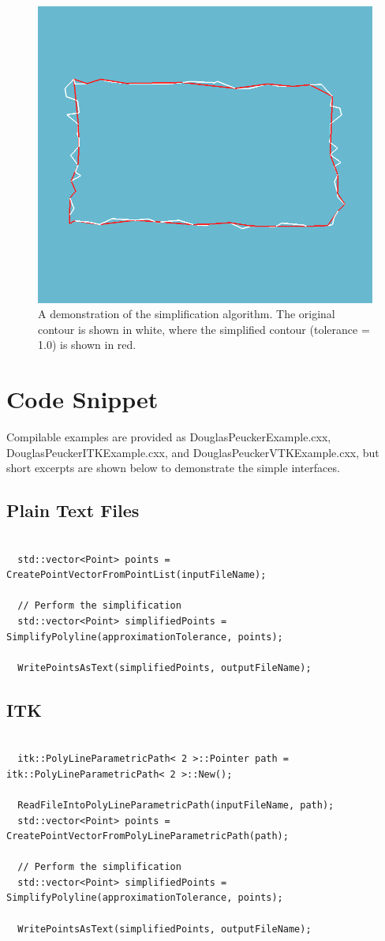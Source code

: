 \documentclass{InsightArticle}
\begin{document}
\begin{figure}[H]
  \centering
  \includegraphics[width=0.3\linewidth]{images/demo}
  \caption{A demonstration of the simplification algorithm. The original contour is shown in white, where the simplified contour (tolerance = 1.0) is shown in red.}
  \label{fig:Demo}
\end{figure}


\section{Code Snippet}

Compilable examples are provided as DouglasPeuckerExample.cxx, DouglasPeuckerITKExample.cxx, and DouglasPeuckerVTKExample.cxx, but short excerpts are shown below to demonstrate the simple interfaces.

\subsection{Plain Text Files}
\begin{verbatim}

  std::vector<Point> points = CreatePointVectorFromPointList(inputFileName);
  
  // Perform the simplification
  std::vector<Point> simplifiedPoints = SimplifyPolyline(approximationTolerance, points);
  
  WritePointsAsText(simplifiedPoints, outputFileName);
\end{verbatim}

\subsection{ITK}
\begin{verbatim}
  
  itk::PolyLineParametricPath< 2 >::Pointer path = itk::PolyLineParametricPath< 2 >::New();
  
  ReadFileIntoPolyLineParametricPath(inputFileName, path);
  std::vector<Point> points = CreatePointVectorFromPolyLineParametricPath(path);
  
  // Perform the simplification
  std::vector<Point> simplifiedPoints = SimplifyPolyline(approximationTolerance, points);
  
  WritePointsAsText(simplifiedPoints, outputFileName);
  
\end{verbatim}
\end{document}
